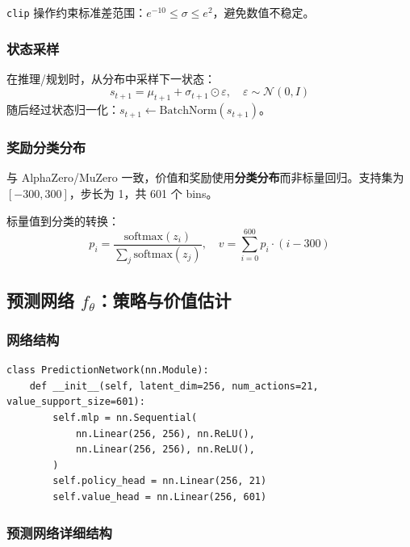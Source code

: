 \documentclass[UTF8, a4paper]{ctexart}
\begin{document}
\texttt{clip} 操作约束标准差范围：$e^{-10} \leq \sigma \leq e^{2}$，避免数值不稳定。

\subsubsection{状态采样}

在推理/规划时，从分布中采样下一状态：
\begin{equation}
s_{t+1} = \mu_{t+1} + \sigma_{t+1} \odot \varepsilon, \quad \varepsilon \sim \mathcal{N}(0, I)
\end{equation}
随后经过状态归一化：$s_{t+1} \leftarrow \text{BatchNorm}(s_{t+1})$。

\subsubsection{奖励分类分布}

与 AlphaZero/MuZero 一致，价值和奖励使用\textbf{分类分布}而非标量回归。支持集为 $[-300, 300]$，步长为 1，共 601 个 bins。

标量值到分类的转换：
\begin{equation}
p_i = \frac{\text{softmax}(z_i)}{\sum_j \text{softmax}(z_j)}, \quad v = \sum_{i=0}^{600} p_i \cdot (i - 300)
\end{equation}

\subsection{预测网络 $f_\theta$：策略与价值估计}

\subsubsection{网络结构}

\begin{lstlisting}
class PredictionNetwork(nn.Module):
    def __init__(self, latent_dim=256, num_actions=21, value_support_size=601):
        self.mlp = nn.Sequential(
            nn.Linear(256, 256), nn.ReLU(),
            nn.Linear(256, 256), nn.ReLU(),
        )
        self.policy_head = nn.Linear(256, 21)
        self.value_head = nn.Linear(256, 601)
\end{lstlisting}

\subsubsection{预测网络详细结构}
\end{document}
